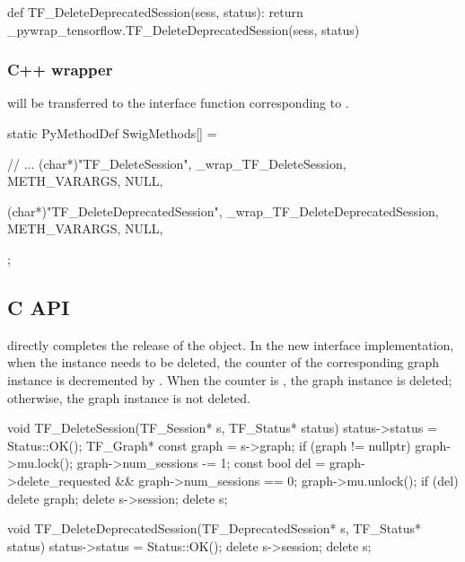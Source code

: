 \begin{content}
\begin{leftbar}
\begin{python}[caption={tensorflow/bazel-bin/tensorflow/python/pywrap\_tensorflow\_internal.py}]
def TF_DeleteDeprecatedSession(sess, status):
  return _pywrap_tensorflow.TF_DeleteDeprecatedSession(sess, status)
\end{python}
\end{leftbar}


\subsubsection{C++ wrapper}
 will be transferred to the  interface function corresponding to .

\begin{leftbar}
\begin{c++}[caption={tensorflow/bazel-bin/tensorflow/python/pywrap\_tensorflow\_internal.cc}]
static PyMethodDef SwigMethods[] = {
  // ...
  { (char*)"TF_DeleteSession", 
    _wrap_TF_DeleteSession, METH_VARARGS, NULL},

  { (char*)"TF_DeleteDeprecatedSession", 
    _wrap_TF_DeleteDeprecatedSession, METH_VARARGS, NULL},
};
\end{c++}
\end{leftbar}


\subsection{C API}
 directly completes the release of the  object. In the new interface  implementation, when the  instance needs to be deleted, the counter of the corresponding graph instance is decremented by . When the counter is , the graph instance is deleted; otherwise, the graph instance is not deleted.

\begin{leftbar}
\begin{c++}[caption={tensorflow/c/c\_api.c}]
void TF_DeleteSession(TF_Session* s, TF_Status* status) {
  status->status = Status::OK();
  TF_Graph* const graph = s->graph;
  if (graph != nullptr) {
    graph->mu.lock();
    graph->num_sessions -= 1;
    const bool del = graph->delete_requested && graph->num_sessions == 0;
    graph->mu.unlock();
    if (del) delete graph;
  }
  delete s->session;
  delete s;
}

void TF_DeleteDeprecatedSession(TF_DeprecatedSession* s, TF_Status* status) {
  status->status = Status::OK();
  delete s->session;
  delete s;
}
\end{c++}
\end{leftbar}



\end{content}
